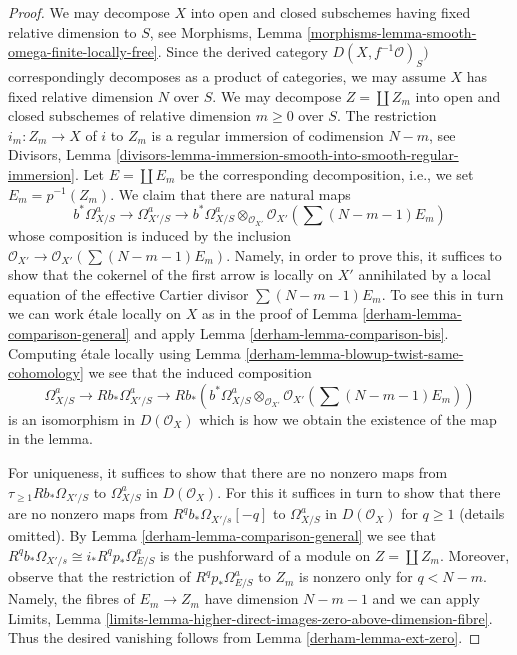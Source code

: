 \begin{proof}

We may decompose $X$ into open and closed subschemes
having fixed relative dimension to $S$, see
Morphisms, Lemma \ref{morphisms-lemma-smooth-omega-finite-locally-free}.
Since the derived category $D(X, f^{-1}\mathcal{O})_S)$ correspondingly
decomposes as a product of categories, we may assume $X$ has
fixed relative dimension $N$ over $S$. We may decompose
$Z = \coprod Z_m$ into open and closed subschemes of relative
dimension $m \geq 0$ over $S$. The restriction $i_m : Z_m \to X$ of
$i$ to $Z_m$ is a regular immersion of codimension $N - m$, see Divisors, Lemma
\ref{divisors-lemma-immersion-smooth-into-smooth-regular-immersion}.
Let $E = \coprod E_m$ be the corresponding decomposition, i.e.,
we set $E_m = p^{-1}(Z_m)$. We claim that there are natural maps
$$
b^*\Omega^a_{X/S} \to \Omega^a_{X'/S} \to
b^*\Omega^a_{X/S} \otimes_{\mathcal{O}_{X'}}
\mathcal{O}_{X'}(\sum (N - m - 1)E_m)
$$
whose composition is induced by the inclusion
$\mathcal{O}_{X'} \to \mathcal{O}_{X'}(\sum (N - m - 1)E_m)$.
Namely, in order to prove this, it suffices to show that the
cokernel of the first arrow is locally on $X'$ annihilated by
a local equation of the effective Cartier divisor $\sum (N - m - 1)E_m$.
To see this in turn we can work \'etale locally on $X$ as in the
proof of Lemma \ref{derham-lemma-comparison-general} and apply
Lemma \ref{derham-lemma-comparison-bis}.
Computing \'etale locally using Lemma \ref{derham-lemma-blowup-twist-same-cohomology}
we see that the induced composition
$$
\Omega^a_{X/S} \to Rb_*\Omega^a_{X'/S} \to
Rb_*\left(b^*\Omega^a_{X/S} \otimes_{\mathcal{O}_{X'}}
\mathcal{O}_{X'}(\sum (N - m - 1)E_m)\right)
$$
is an isomorphism in $D(\mathcal{O}_X)$
which is how we obtain the existence of the map in the lemma.

\medskip\noindent
For uniqueness, it suffices to show that there are no nonzero maps from
$\tau_{\geq 1}Rb_*\Omega_{X'/S}$ to $\Omega^a_{X/S}$ in $D(\mathcal{O}_X)$.
For this it suffices in turn to show that there are no nonzero maps
from $R^qb_*\Omega_{X'/s}[-q]$ to $\Omega^a_{X/S}$ in $D(\mathcal{O}_X)$
for $q \geq 1$ (details omitted). By
Lemma \ref{derham-lemma-comparison-general}
we see that $R^qb_*\Omega_{X'/s} \cong i_*R^qp_*\Omega^a_{E/S}$
is the pushforward of a module on $Z = \coprod Z_m$.
Moreover, observe that the restriction of $R^qp_*\Omega^a_{E/S}$
to $Z_m$ is nonzero only for $q < N - m$. Namely, the fibres of
$E_m \to Z_m$ have dimension $N - m - 1$ and we can apply Limits, Lemma
\ref{limits-lemma-higher-direct-images-zero-above-dimension-fibre}.
Thus the desired vanishing follows from Lemma \ref{derham-lemma-ext-zero}.
\end{proof}

